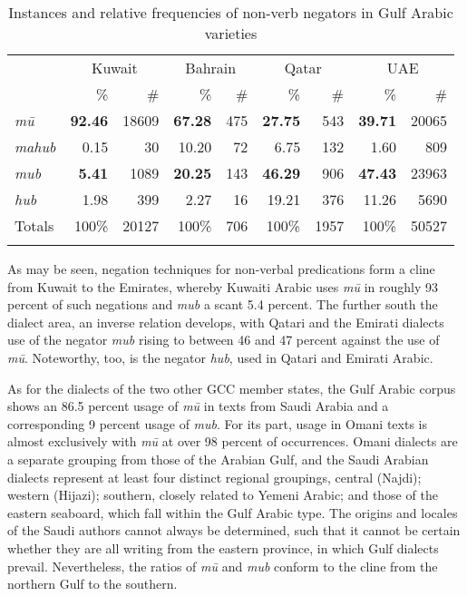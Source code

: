 \documentclass[output=paper,colorlinks,citecolor=brown]{langscibook}
\begin{document}
\begin{table}
	\centering
	\caption{Instances and relative frequencies of non-verb negators in Gulf Arabic varieties}
	\label{tab:WiAR-3}
\begin{tabular}{lrrrrrrrr}
\lsptoprule
\textit{} & \multicolumn{2}{c}{Kuwait} & \multicolumn{2}{c}{Bahrain} & \multicolumn{2}{c}{Qatar} & \multicolumn{2}{c}{UAE} \\ \cmidrule(lr){2-3}\cmidrule(lr){4-5}\cmidrule(lr){6-7}\cmidrule(lr){8-9}
\textit{} & \% & \# & \% & \# & \% & \# & \% & \# \\ \midrule
\textit{mū} & \textbf{92.46} & 18609 & \textbf{67.28} & 475 & \textbf{27.75} & 543 & \textbf{39.71} & 20065 \\
\textit{mahub} & 0.15 & 30 & 10.20 & 72 & 6.75 & 132 & 1.60 & 809 \\
\textit{mub} & \textbf{5.41} & 1089 & \textbf{20.25} & 143 & \textbf{46.29} & 906 & \textbf{47.43} & 23963 \\
\textit{hub} & 1.98 & 399 & 2.27 & 16 & 19.21 & 376 & 11.26 & 5690 \\ \midrule
Totals & 100\% & 20127 & 100\% & 706 & 100\% & 1957 & 100\% & 50527 \\ \lspbottomrule   
\end{tabular}
\end{table}

As may be seen, negation techniques for non-verbal predications form a cline from Kuwait to the Emirates, whereby Kuwaiti Arabic uses \textit{mū} in roughly 93 percent of such negations and \textit{mub} a scant 5.4 percent. The further south the dialect area, an inverse relation develops, with Qatari and the Emirati dialects use of the negator \textit{mub} rising to between 46 and 47 percent against the use of \textit{mū}. Noteworthy, too, is the negator \textit{hub}, used in Qatari and Emirati Arabic.

As for the dialects of the two other GCC member states, the Gulf Arabic corpus shows an 86.5 percent usage of \textit{mū} in texts from Saudi Arabia and a corresponding 9 percent usage of \textit{mub}. For its part, usage in Omani texts is almost exclusively with \textit{mū} at over 98 percent of occurrences. Omani dialects are a separate grouping from those of the Arabian Gulf, and the Saudi Arabian dialects represent at least four distinct regional groupings, central (Najdi); western (Hijazi); southern, closely related to Yemeni Arabic; and those of the eastern seaboard, which fall within the Gulf Arabic type. The origins and locales of the Saudi authors cannot always be determined, such that it cannot be certain whether they are all writing from the eastern province, in which Gulf dialects prevail. Nevertheless, the ratios of \textit{mū} and \textit{mub} conform to the cline from the northern Gulf to the southern.
\end{document}

